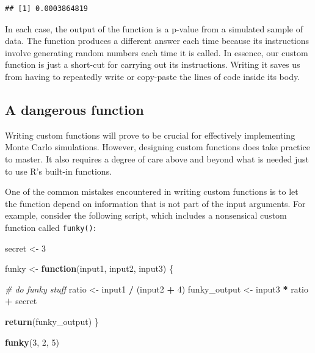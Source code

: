 \documentclass[
]{book}
\newenvironment{Shaded}{\begin{snugshade}}{\end{snugshade}}
\newcommand{\CommentTok}[1]{\textcolor[rgb]{0.56,0.35,0.01}{\textit{#1}}}
\newcommand{\ControlFlowTok}[1]{\textcolor[rgb]{0.13,0.29,0.53}{\textbf{#1}}}
\newcommand{\DecValTok}[1]{\textcolor[rgb]{0.00,0.00,0.81}{#1}}
\newcommand{\FunctionTok}[1]{\textcolor[rgb]{0.13,0.29,0.53}{\textbf{#1}}}
\newcommand{\NormalTok}[1]{#1}
\newcommand{\OtherTok}[1]{\textcolor[rgb]{0.56,0.35,0.01}{#1}}
\newcommand{\SpecialCharTok}[1]{\textcolor[rgb]{0.81,0.36,0.00}{\textbf{#1}}}
\begin{document}
\begin{verbatim}
## [1] 0.0003864819
\end{verbatim}

In each case, the output of the function is a p-value from a simulated sample of data. The function produces a different answer each time because its instructions involve generating random numbers each time it is called.
In essence, our custom function is just a short-cut for carrying out its instructions.
Writing it saves us from having to repeatedly write or copy-paste the lines of code inside its body.

\subsection{A dangerous function}\label{a-dangerous-function}

Writing custom functions will prove to be crucial for effectively implementing Monte Carlo simulations.
However, designing custom functions does take practice to master.
It also requires a degree of care above and beyond what is needed just to use R's built-in functions.

One of the common mistakes encountered in writing custom functions is to let the function depend on information that is not part of the input arguments.
For example, consider the following script, which includes a nonsensical custom function called \texttt{funky()}:

\begin{Shaded}
\begin{Highlighting}[]
\NormalTok{secret }\OtherTok{\textless{}{-}} \DecValTok{3}

\NormalTok{funky }\OtherTok{\textless{}{-}} \ControlFlowTok{function}\NormalTok{(input1, input2, input3) \{}
  
  \CommentTok{\# do funky stuff}
\NormalTok{  ratio }\OtherTok{\textless{}{-}}\NormalTok{ input1 }\SpecialCharTok{/}\NormalTok{ (input2 }\SpecialCharTok{+} \DecValTok{4}\NormalTok{)}
\NormalTok{  funky\_output }\OtherTok{\textless{}{-}}\NormalTok{ input3 }\SpecialCharTok{*}\NormalTok{ ratio }\SpecialCharTok{+}\NormalTok{ secret}
  
  \FunctionTok{return}\NormalTok{(funky\_output)  }
\NormalTok{\}}

\FunctionTok{funky}\NormalTok{(}\DecValTok{3}\NormalTok{, }\DecValTok{2}\NormalTok{, }\DecValTok{5}\NormalTok{)}
\end{Highlighting}
\end{Shaded}
\end{document}

